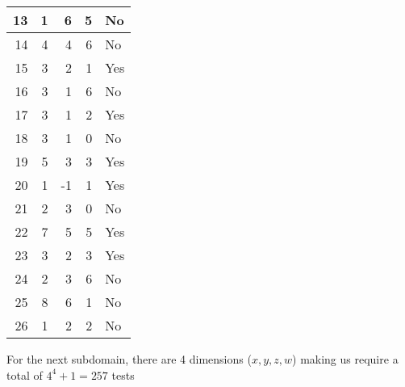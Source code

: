 \documentclass[12pt, letterpaper, titlepage]{article}
\begin{document}
\begin{tabular}{|r|r|r|r|l|}
        13                                & 1                      & 6                      & 5                      & No      \\ \hline
        14                                & 4                      & 4                      & 6                      & No      \\ \hline
        15                                & 3                      & 2                      & 1                      & Yes     \\ \hline
        16                                & 3                      & 1                      & 6                      & No      \\ \hline
        17                                & 3                      & 1                      & 2                      & Yes     \\ \hline
        18                                & 3                      & 1                      & 0                      & No      \\ \hline
        19                                & 5                      & 3                      & 3                      & Yes     \\ \hline
        20                                & 1                      & -1                     & 1                      & Yes     \\ \hline
        21                                & 2                      & 3                      & 0                      & No      \\ \hline
        22                                & 7                      & 5                      & 5                      & Yes     \\ \hline
        23                                & 3                      & 2                      & 3                      & Yes     \\ \hline
        24                                & 2                      & 3                      & 6                      & No      \\ \hline
        25                                & 8                      & 6                      & 1                      & No      \\ \hline
        26                                & 1                      & 2                      & 2                      & No      \\ \hline
        \end{tabular}


For the next subdomain, there are 4 dimensions ($x, y, z, w$) making us require a total of $4^4 + 1 = 257$ tests
\end{document}
